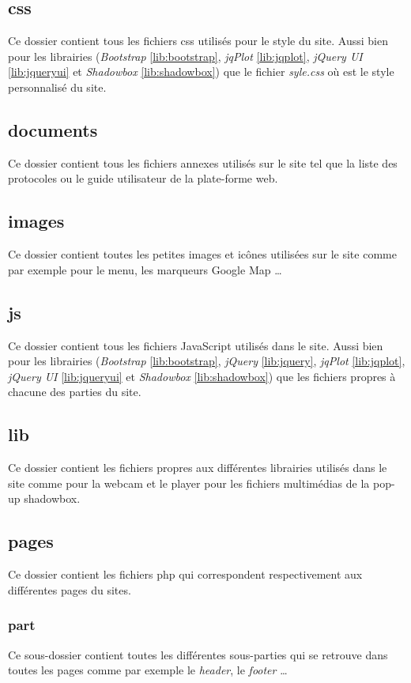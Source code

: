 \documentclass[twoside]{EPURapport}
\begin{document}
		\subsection{css}
		Ce dossier contient tous les fichiers css utilisés pour le style du site. Aussi bien pour les librairies (\emph{Bootstrap} \ref{lib:bootstrap}, \emph{jqPlot} \ref{lib:jqplot}, \emph{jQuery UI} \ref{lib:jqueryui} et \emph{Shadowbox} \ref{lib:shadowbox}) que le fichier \emph{syle.css} où est le style personnalisé du site.
		
		\subsection{documents}
		Ce dossier contient tous les fichiers annexes utilisés sur le site tel que la liste des protocoles ou le guide utilisateur de la plate-forme web.
		
		\subsection{images}
		Ce dossier contient toutes les petites images et icônes utilisées sur le site comme par exemple pour le menu, les marqueurs Google Map \ldots
		
		\subsection{js}
		Ce dossier contient tous les fichiers JavaScript utilisés dans le site. Aussi bien pour les librairies (\emph{Bootstrap} \ref{lib:bootstrap}, \emph{jQuery} \ref{lib:jquery}, \emph{jqPlot} \ref{lib:jqplot}, \emph{jQuery UI} \ref{lib:jqueryui} et \emph{Shadowbox} \ref{lib:shadowbox}) que les fichiers propres à chacune des parties du site.
		
		\subsection{lib}
		Ce dossier contient les fichiers propres aux différentes librairies utilisés dans le site comme pour la webcam et le player pour les fichiers multimédias de la pop-up shadowbox.
		
		\subsection{pages}
		Ce dossier contient les fichiers php qui correspondent respectivement aux différentes pages du sites.
		
			\subsubsection{part}
			Ce sous-dossier contient toutes les différentes sous-parties qui se retrouve dans toutes les pages comme par exemple le \emph{header}, le \emph{footer} \ldots
		
\end{document}
